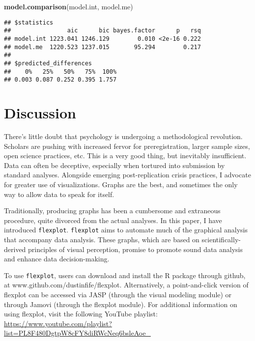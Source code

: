 \documentclass[
  english,
  man]{apa6}
\newenvironment{Shaded}{\begin{snugshade}}{\end{snugshade}}
\newcommand{\KeywordTok}[1]{\textcolor[rgb]{0.13,0.29,0.53}{\textbf{#1}}}
\newcommand{\NormalTok}[1]{#1}
\begin{document}
\small

\begin{Shaded}
\begin{Highlighting}[]
\KeywordTok{model.comparison}\NormalTok{(model.int, model.me)}
\end{Highlighting}
\end{Shaded}

\begin{verbatim}
## $statistics
##                aic      bic bayes.factor      p   rsq
## model.int 1223.041 1246.129        0.010 <2e-16 0.222
## model.me  1220.523 1237.015       95.294        0.217
## 
## $predicted_differences
##    0%   25%   50%   75%  100% 
## 0.003 0.087 0.252 0.395 1.757
\end{verbatim}

\normalsize

\hypertarget{discussion}{%
\section{Discussion}\label{discussion}}

There's little doubt that psychology is undergoing a methodological revolution. Scholars are pushing with increased fervor for preregistration, larger sample sizes, open science practices, etc. This is a very good thing, but inevitably insufficient. Data can often be deceptive, especially when tortured into submission by standard analyses. Alongside emerging post-replication crisis practices, I advocate for greater use of visualizations. Graphs are the best, and sometimes the only way to allow data to speak for itself.

Traditionally, producing graphs has been a cumbersome and extraneous procedure, quite divorced from the actual analyses. In this paper, I have introduced \texttt{flexplot}. \texttt{flexplot} aims to automate much of the graphical analysis that accompany data analysis. These graphs, which are based on scientifically-derived principles of visual perception, promise to promote sound data analysis and enhance data decision-making.

To use \texttt{flexplot}, users can download and install the R package through github, at www.github.com/dustinfife/flexplot. Alternatively, a point-and-click version of flexplot can be accessed via JASP (through the visual modeling module) or through Jamovi (through the flexplot module). For additional information on using flexplot, visit the following YouTube playlist: \url{https://www.youtube.com/playlist?list=PL8F480DgtpW8cFY8diRWcNeq6bsleAoe_}
\end{document}

